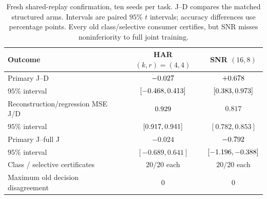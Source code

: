 \begin{table}[t]
\centering
\caption{Fresh shared-replay confirmation, ten seeds per task. J--D compares
the matched structured arms. Intervals are paired $95\%$ $t$ intervals;
accuracy differences use percentage points. Every old class/selective
consumer certifies, but SNR misses noninferiority to full joint training.}
\label{tab:shared_replay}
\small
\begin{tabular}{lcc}
\toprule
Outcome & HAR $(k,r)=(4,4)$ & SNR $(16,8)$ \\
\midrule
Primary J--D & $-0.027$ & $+0.678$ \\
$95\%$ interval & $[-0.468,0.413]$ & $[0.383,0.973]$ \\
Reconstruction/regression MSE J/D & $0.929$ & $0.817$ \\
$95\%$ interval & $[0.917,0.941]$ & $[0.782,0.853]$ \\
Primary J--full J & $-0.024$ & $-0.792$ \\
$95\%$ interval & $[-0.689,0.641]$ & $[-1.196,-0.388]$ \\
Class / selective certificates & $20/20$ each & $20/20$ each \\
Maximum old decision disagreement & $0$ & $0$ \\
\bottomrule
\end{tabular}
\end{table}
